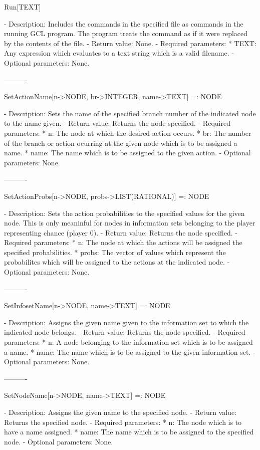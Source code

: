 Run[TEXT]

   -	Description:  Includes the commands in the specified file as commands 
	in the running GCL program.  The program treats the command as if it 
	were replaced by the contents of the file.
   -	Return value:  None.
   -	Required parameters:
	  *  TEXT:  Any expression which evaluates to a text string which is a
		valid filename.
   -	Optional parameters:  None.

----------

SetActionName[n->NODE, br->INTEGER, name->TEXT] =: NODE

   -	Description:  Sets the name of the specified branch number of the 
	indicated node to the name given.
   -	Return value:  Returns the node specified.
   -	Required parameters:
	  *  n:  The node at which the desired action occurs.
	  *  br:  The number of the branch or action ocurring at the given node
		which is to be assigned a name.
	  *  name:  The name which is to be assigned to the given action.
   -	Optional parameters:  None.

----------

SetActionProbs[n->NODE, probs->LIST(RATIONAL)] =: NODE

   -	Description:  Sets the action probabilities to the specified values 
	for the given node.  This is only meaninful for nodes in information
	sets belonging to the player representing chance (player 0).
   -	Return value:  Returns the node specified.
   -	Required parameters:
	  *  n:  The node at which the actions will be assigned the specified
		probabilities.
	  *  probs:  The vector of values which represent the probabilites 
		which will be assigned to the actions at the indicated node.
   -	Optional parameters:  None.

----------

SetInfosetName[n->NODE, name->TEXT] =: NODE

   -	Description:  Assigns the given name given to the information set to 
	which the indicated node belongs.
   -	Return value:  Returns the node specified.
   -	Required parameters:
	  *  n:  A node belonging to the information set which is to be 
		assigned a name.
	  *  name:  The name which is to be assigned to the given information
		set.
   -	Optional parameters:  None.

----------

SetNodeName[n->NODE, name->TEXT] =: NODE

   -	Description:  Assigns the given name to the specified node.
   -	Return value:  Returns the specified node.
   -	Required parameters:
	  *  n:  The node which is to have a name assigned.
	  *  name:  The name which is to be assigned to the specified node.
   -	Optional parameters:  None.

